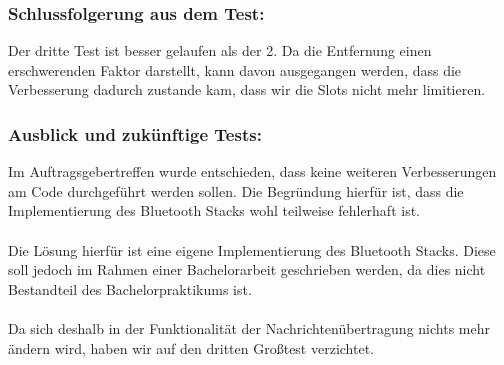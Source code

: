 \subsubsection{Schlussfolgerung aus dem
Test:}\label{schlussfolgerung-aus-dem-test-4}

Der dritte Test ist besser gelaufen als der 2. Da die Entfernung einen
erschwerenden Faktor darstellt, kann davon ausgegangen werden, dass die
Verbesserung dadurch zustande kam, dass wir die Slots nicht mehr
limitieren.

\subsubsection{Ausblick und zukünftige
Tests:}\label{ausblick-und-zukuxfcnftige-tests}

Im Auftragsgebertreffen wurde entschieden, dass keine weiteren
Verbesserungen am Code durchgeführt werden sollen. Die Begründung
hierfür ist, dass die Implementierung des Bluetooth Stacks wohl
teilweise fehlerhaft ist.
\\\\
Die Lösung hierfür ist eine eigene Implementierung des Bluetooth Stacks.
Diese soll jedoch im Rahmen einer Bachelorarbeit geschrieben werden, da
dies nicht Bestandteil des Bachelorpraktikums ist.
\\\\
Da sich deshalb in der Funktionalität der Nachrichtenübertragung nichts
mehr ändern wird, haben wir auf den dritten Großtest verzichtet.